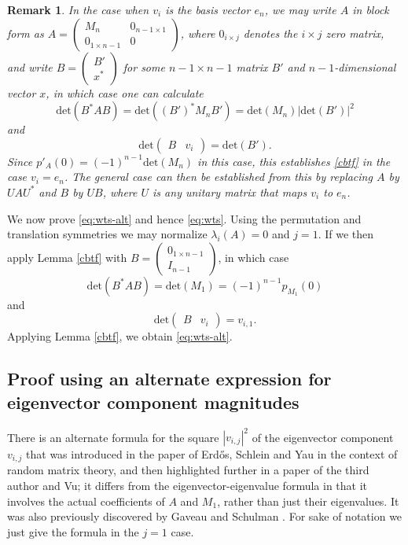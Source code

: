 \documentclass{amsart}
\newtheorem{remark}[lemma]{Remark}
\begin{document}
\begin{remark}  In the case when $v_i$ is the basis vector $e_n$, we may write $A$ in block form as $A = \begin{pmatrix} M_n & 0_{n-1 \times 1} \\ 0_{1 \times n-1} & 0 \end{pmatrix}$, where $0_{i \times j}$ denotes the $i \times j$ zero matrix, and write $B = \begin{pmatrix} B' \\ x^* \end{pmatrix}$ for some $n-1 \times n-1$ matrix $B'$ and $n-1$-dimensional vector $x$, in which case one can calculate
$$ \mathrm{det}(B^* A B) = \mathrm{det}( (B')^* M_n B' ) = \mathrm{det}(M_n) |\mathrm{det}(B')|^2$$
and
$$ \mathrm{det} \begin{pmatrix} B & v_i \end{pmatrix} = \mathrm{det}(B').$$
Since $p'_A(0) = (-1)^{n-1} \mathrm{det}(M_n)$ in this case, this establishes \eqref{cbtf} in the case $v_i=e_n$.  The general case can then be established from this by replacing $A$ by $UAU^*$ and $B$ by $UB$, where $U$ is any unitary matrix that maps $v_i$ to $e_n$.
\end{remark}

We now prove \eqref{eq:wts-alt} and hence \eqref{eq:wts}.  Using the permutation and translation symmetries we may normalize $\lambda_i(A)=0$ and $j=1$.  If we then apply Lemma \ref{cbtf} with $B = \begin{pmatrix} 0_{1 \times n-1} \\ I_{n-1} \end{pmatrix}$, in which case
$$ \mathrm{det}( B^* A B ) = \mathrm{det}(M_1) = (-1)^{n-1} p_{M_1}(0)$$
and
$$ \mathrm{det} \begin{pmatrix} B & v_i \end{pmatrix} = v_{i,1}.$$
Applying Lemma \ref{cbtf}, we obtain \eqref{eq:wts-alt}.

\subsection{Proof using an alternate expression for eigenvector component magnitudes}

There is an alternate formula for the square $|v_{i,j}|^2$ of the eigenvector component $v_{i,j}$ that was introduced in the paper \cite[(5.8)]{ESY} of Erd\H{o}s, Schlein and Yau in the context of random matrix theory, and then highlighted further in a paper \cite[Lemma 41]{tao2011} of the third author and Vu; it differs from the eigenvector-eigenvalue formula in that it involves the actual coefficients of $A$ and $M_1$, rather than just their eigenvalues.  It was also previously discovered by Gaveau and Schulman \cite[(2.6)]{gaveau}. For sake of notation we just give the formula in the $j=1$ case.
\end{document}
